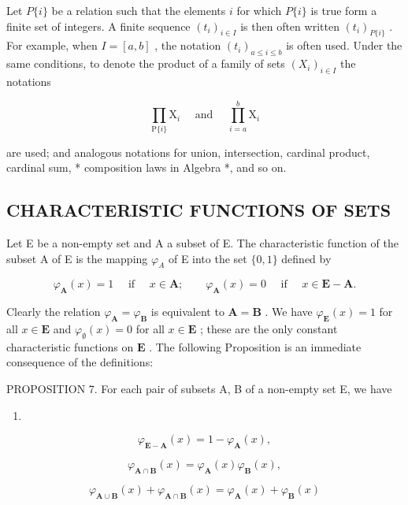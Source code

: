 Let \(P\{i\}\) be a relation such that the elements \(i\) for which \(P\{i\}\) is true form a finite set of integers. A finite sequence \((t_i)_{i \in I}\) is then often written \((t_i)_{P\{i\}}\) . For example, when \(I = [a, b]\) , the notation \((t_i)_{a \leqslant i \leqslant b}\) is often used. Under the same conditions, to denote the product of a family of sets \((X_i)_{i \in I}\) the notations

\[
\prod_ {\mathrm{P} \{i \}} \mathrm{X} _ {i} \quad \text { and } \quad \prod_ {i = a} ^ {b} \mathrm{X} _ {i}
\]

are used; and analogous notations for union, intersection, cardinal product, cardinal sum, * composition laws in Algebra *, and so on.

\subsection{CHARACTERISTIC FUNCTIONS OF SETS}

Let E be a non-empty set and A a subset of E. The characteristic function of the subset A of E is the mapping \(\varphi_{A}\) of E into the set \(\{0, 1\}\) defined by

\[
\varphi_ {\mathbf {A}} (x) = 1 \quad \text { if } \quad x \in \mathbf {A}; \qquad \varphi_ {\mathbf {A}} (x) = 0 \quad \text { if } \quad x \in \mathbf {E} - \mathbf {A}.
\]

Clearly the relation \(\varphi_{\mathbf{A}} = \varphi_{\mathbf{B}}\) is equivalent to \(\mathbf{A} = \mathbf{B}\) . We have \(\varphi_{\mathbf{E}}(x) = 1\) for all \(x \in \mathbf{E}\) and \(\varphi_{\emptyset}(x) = 0\) for all \(x \in \mathbf{E}\) ; these are the only constant characteristic functions on \(\mathbf{E}\) . The following Proposition is an immediate consequence of the definitions:

PROPOSITION 7. For each pair of subsets A, B of a non-empty set E, we have

\begin{enumerate}
\def\labelenumi{(\arabic{enumi})}
\tightlist
\item
\end{enumerate}

\[
\varphi_ {\mathbf {E} - \mathbf {A}} (x) = 1 - \varphi_ {\mathbf {A}} (x),\tag{2}
\]

\[
\varphi_ {\mathbf {A} \cap \mathbf {B}} (x) = \varphi_ {\mathbf {A}} (x) \varphi_ {\mathbf {B}} (x),\tag{3}
\]

\[
\varphi_ {\mathbf {A} \cup \mathbf {B}} (x) + \varphi_ {\mathbf {A} \cap \mathbf {B}} (x) = \varphi_ {\mathbf {A}} (x) + \varphi_ {\mathbf {B}} (x)
\]

